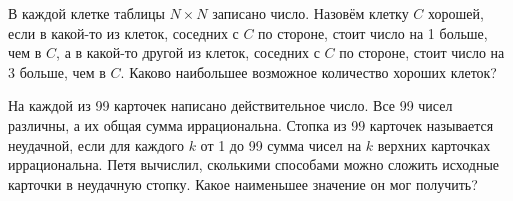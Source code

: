 \documentclass[11pt, a4paper]{template}
\begin{document}
\begin{exercise}
В каждой клетке таблицы $N \times N$ записано число. Назовём клетку $C$ хорошей, если в какой-то из клеток, соседних с $C$ по стороне, стоит число на 1 больше, чем в $C$, а в какой-то другой из клеток, соседних с $C$ по стороне, стоит число на 3 больше, чем в $C$. Каково наибольшее возможное количество хороших клеток?
\end{exercise}

\begin{exercise}
На каждой из 99 карточек написано действительное число. Все 99 чисел различны, а их общая сумма иррациональна. Стопка из 99 карточек называется неудачной, если для каждого $k$ от 1 до 99 сумма чисел на $k$ верхних карточках иррациональна. Петя вычислил, сколькими способами можно сложить исходные карточки в неудачную стопку. Какое наименьшее значение он мог получить?
\end{exercise}
\end{document}
